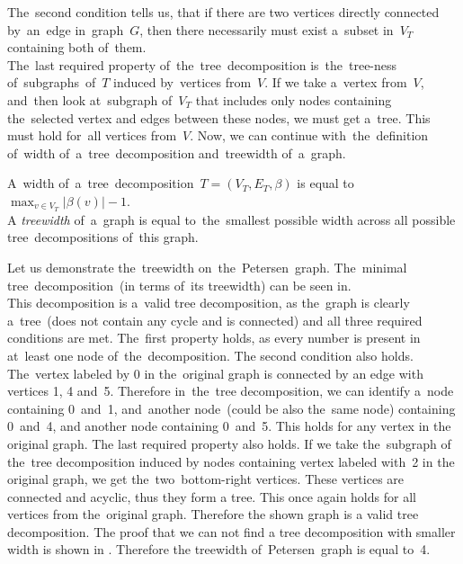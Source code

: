 The~second condition tells us, that if there are two vertices directly connected by~an~edge in~graph~$G$, then there necessarily must exist a~subset in~$V_T$ containing both of~them.\\
The~last required property of~the~tree~decomposition is~the~tree-ness of~subgraphs~of~$T$ induced by~vertices from~$V$. If we take a~vertex from~$V$, and~then look at~subgraph of~$V_T$ that includes only nodes containing the~selected vertex and edges between these nodes, we must get a~tree. This must hold for~all vertices from~$V$.
Now, we can continue with~the~definition of~width of~a~tree~decomposition and~treewidth of~a~graph.
\begin{definition}[Treewidth]
     A~width of~a~tree~decomposition~${T = (V_T, E_T, \beta)}$ is equal to~${\max_{v \in V_T} | \beta(v) | - 1}$. \\
    A \emph{treewidth} of~a~graph is equal to~the~smallest possible width across all possible tree~decompositions of~this graph.
\end{definition}
Let us demonstrate the~treewidth on~the~Petersen~graph. The~minimal tree~decomposition~(in terms of~its treewidth) can be seen in. \\
This decomposition is a~valid tree decomposition, as the~graph is clearly a~tree~(does not contain any cycle and is connected) and all three required conditions are met. The~first property holds, as every number is present in at~least one node of~the~decomposition. The second condition also holds. The~vertex labeled by 0 in the~original graph is connected by an edge with vertices 1, 4 and~5. Therefore in~the~tree decomposition, we can identify a~node containing 0~and~1, and~another node~(could be also the~same node) containing 0~and~4, and another node containing 0~and~5. This holds for any vertex in the original graph. The last required property also holds. If we take the~subgraph of the~tree decomposition induced by nodes containing vertex labeled with~2 in the original graph, we get the~two~bottom-right vertices. These vertices are connected and acyclic, thus they form a tree. This once again holds for all vertices from the~original graph. Therefore the shown graph is a valid tree decomposition. The proof that we can not find a tree decomposition with smaller width is shown in \cite{Huszár}.
Therefore the treewidth of~Petersen~graph is equal to~4.
